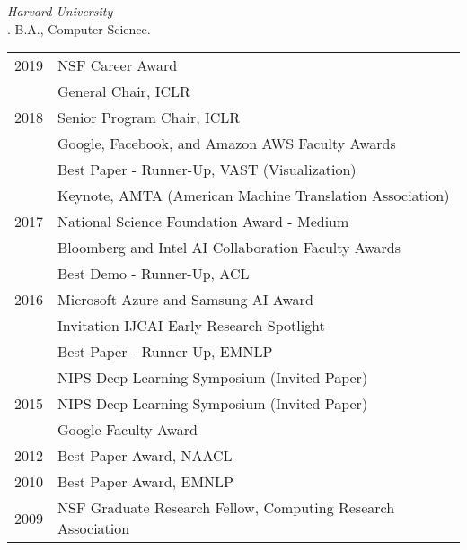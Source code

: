 \documentclass[10pt]{article}
\begin{document}
\medskip
\noindent\emph{Harvard University\vspace{0.02in}}\\
. B.A., Computer Science.

\bigskip


\medskip

\hspace{-1cm} \begin{tabular}{lp{11.5cm}}
2019 & NSF Career Award \\
     & General Chair, ICLR \\
2018 & Senior Program Chair, ICLR  \\
& Google, Facebook, and Amazon AWS Faculty Awards \\
& Best Paper - Runner-Up, VAST (Visualization)  \\
& Keynote, AMTA (American Machine Translation Association) \\
2017 & National Science Foundation Award - Medium \\
 & Bloomberg and Intel AI Collaboration Faculty Awards \\
& Best Demo  - Runner-Up, ACL  \\
2016 & Microsoft Azure  and Samsung AI Award \\
 & Invitation IJCAI Early Research Spotlight \\
& Best Paper - Runner-Up, EMNLP \\
 & NIPS Deep Learning Symposium (Invited Paper)  \\
2015 & NIPS Deep Learning Symposium (Invited Paper)   \\
 & Google Faculty Award \\
2012 & Best Paper Award, NAACL \\
2010 & Best Paper Award, EMNLP \\
2009 & NSF Graduate Research Fellow, Computing Research Association\\
\end{tabular}
\pagebreak
\bigskip
\end{document}
